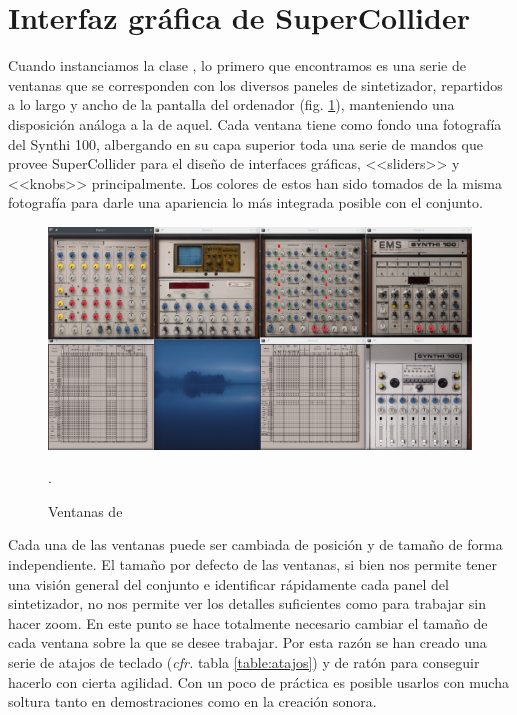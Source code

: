 \section[Interfaz gráfica de SuperCollider]{Interfaz gráfica de SuperCollider}

Cuando instanciamos la clase \texttt{\className}, lo primero que encontramos es una serie de ventanas que se corresponden con los diversos paneles de sintetizador, repartidos a lo largo y ancho de la pantalla del ordenador (fig. \ref{fig:aspecto_SynthiGME}), manteniendo una disposición análoga a la de aquel. Cada ventana tiene como fondo una fotografía del Synthi 100, albergando en su capa superior toda una serie de mandos que provee SuperCollider para el diseño de interfaces gráficas, <<sliders>> y <<knobs>> principalmente. Los colores de estos han sido tomados de la misma fotografía para darle una apariencia lo más integrada posible con el conjunto. 

\begin{figure}
	\centering
	\includegraphics[width=1\textwidth]{images/todos_los_paneles}
	\caption[Ventanas de \appName]{Ventanas de \appName}.
	\label{fig:aspecto_SynthiGME}
\end{figure}
	
Cada una de las ventanas puede ser cambiada de posición y de tamaño de forma independiente. El tamaño por defecto de las ventanas, si bien nos permite tener una visión general del conjunto e identificar rápidamente cada panel del sintetizador, no nos permite ver los detalles suficientes como para trabajar sin hacer zoom. En este punto se hace totalmente necesario cambiar el tamaño de cada ventana sobre la que se desee trabajar. Por esta razón se han creado una serie de atajos de teclado (\textit{cfr.} tabla \ref{table:atajos})  y de ratón para conseguir hacerlo con cierta agilidad. Con un poco de práctica es posible usarlos con mucha soltura tanto en demostraciones como en la creación sonora.
	

